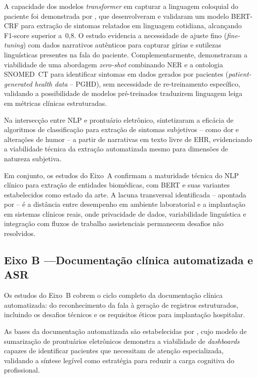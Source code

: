 \documentclass[a4paper,fleqn]{cas-sc}
\begin{document}
A capacidade dos modelos \textit{transformer} em capturar a linguagem
coloquial do paciente foi demonstrada por \citet{Watabe2025}, que
desenvolveram e validaram um modelo BERT-CRF para extração de
sintomas relatados em linguagem cotidiana, alcançando F1-score
superior a~0,8. O estudo evidencia a necessidade de ajuste fino
(\textit{fine-tuning}) com dados narrativos autênticos para capturar
gírias e sutilezas linguísticas presentes na fala do paciente.
Complementarmente, \citet{Sezgin2023} demonstraram a viabilidade de
uma abordagem \textit{zero-shot} combinando NER e a ontologia SNOMED~CT
para identificar sintomas em dados gerados por pacientes
(\textit{patient-generated health data} -- PGHD), sem necessidade de
re-treinamento específico, validando a possibilidade de modelos
pré-treinados traduzirem linguagem leiga em métricas clínicas
estruturadas.

Na intersecção entre NLP e prontuário eletrônico, \citet{Koleck2019}
sintetizaram a eficácia de algoritmos de classificação para extração
de sintomas subjetivos -- como dor e alterações de humor -- a partir
de narrativas em texto livre de EHR, evidenciando a viabilidade
técnica da extração automatizada mesmo para dimensões de natureza
subjetiva.

Em conjunto, os estudos do Eixo~A confirmam a maturidade técnica do
NLP clínico para extração de entidades biomédicas, com BERT e suas
variantes estabelecidos como estado da arte. A lacuna transversal
identificada -- apontada por \citet{Navarro2023}
-- é a distância entre desempenho em ambiente laboratorial e a
implantação em sistemas clínicos reais, onde privacidade de dados,
variabilidade linguística e integração com fluxos de trabalho
assistenciais permanecem desafios não resolvidos.

\subsection{Eixo B —Documentação clínica automatizada e ASR}
\label{subsec:eixoB}

Os estudos do Eixo~B cobrem o ciclo completo da documentação clínica
automatizada: do reconhecimento da fala à geração de registros
estruturados, incluindo os desafios técnicos e os requisitos éticos
para implantação hospitalar.

As bases da documentação automatizada são estabelecidas por
\citet{Aleksic2017}, cujo modelo de sumarização de prontuários
eletrônicos demonstra a viabilidade de \textit{dashboards} capazes
de identificar pacientes que necessitam de atenção especializada,
validando a síntese legível como estratégia para reduzir a carga
cognitiva do profissional.
\end{document}
